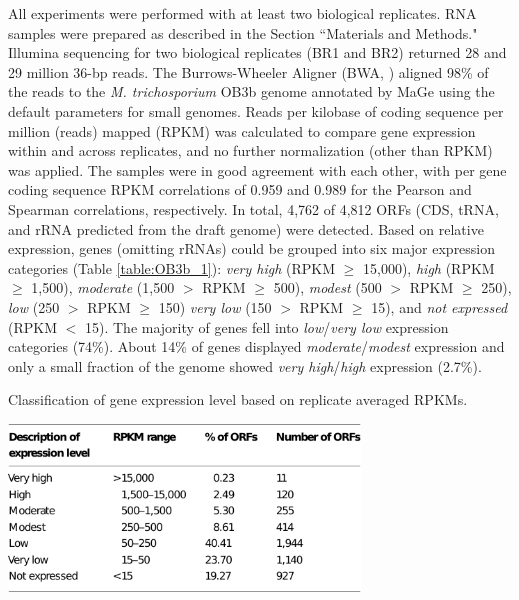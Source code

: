 All experiments were performed with at least two biological replicates.
RNA samples were prepared as described in the Section ``Materials and Methods."
Illumina sequencing for two biological replicates (BR1 and BR2) returned 28 and 29 million 36-bp reads.
The Burrows-Wheeler Aligner (BWA, \cite{li2009}) aligned 98\% of the reads to the \textit{M. trichosporium} OB3b genome annotated by MaGe \cite{vallenet2006} using the default parameters for small genomes.
Reads per kilobase of coding sequence per million (reads) mapped (RPKM) \cite{mortazavi2008} was calculated to compare gene expression within and across replicates, and no further normalization (other than RPKM) was applied.
The samples were in good agreement with each other, with per gene coding sequence RPKM correlations of 0.959 and 0.989 for the Pearson and Spearman correlations, respectively.
In total, 4,762 of 4,812 ORFs (CDS, tRNA, and rRNA predicted from the draft genome) were detected.
Based on relative expression, genes (omitting rRNAs) could be grouped into six major expression categories (Table \ref{table:OB3b_1}): \textit{very high} (RPKM $\geq$ 15,000), \textit{high} (RPKM $\geq$ 1,500), \textit{moderate} (1,500 $>$ RPKM $\geq$ 500), \textit{modest} (500 $>$ RPKM $\geq$ 250), \textit{low} (250 $>$ RPKM $\geq$ 150) \textit{very low} (150 $>$ RPKM $\geq$ 15), and \textit{not expressed} (RPKM $<$ 15).
The majority of genes fell into \textit{low}/\textit{very low} expression categories (74\%).
About 14\% of genes displayed \textit{moderate}/\textit{modest} expression and only a small fraction of the genome showed \textit{very high}/\textit{high} expression (2.7\%).

\begin{table}[H]
    \caption{Classification of gene expression level based on replicate averaged RPKMs.}
    \centering
     \includegraphics[width=0.7\textwidth]{./tex/chapter1/figures/matsen_OB3b_table1--no_header.pdf}
     \label{table:OB3b_1} %
     \begin{singlespace}
     \end{singlespace}
\end{table}


